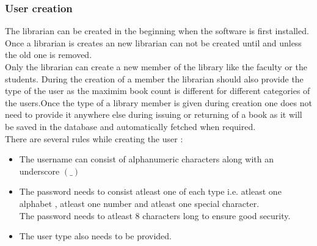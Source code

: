 \documentclass{article}
\begin{document}
\subsubsection*{User creation}
The librarian can be created in the beginning when the software is first installed. Once a librarian is creates an new librarian can not be created until and unless the old one is removed.
\\
Only the librarian can create a new member of the library like the faculty or the students.
During the creation of a member the librarian should also provide the type of the user as the maximim book count is different for different categories of the users.Once the type of a library member is given during creation one does not need to provide it anywhere else during issuing or returning of a book as it will be saved in the database and automatically fetched when required.\\
There are several rules while creating the user :
\begin{itemize}
\item The username can consist of alphanumeric characters along with an underscore $(\_)$
\item The password needs to consist atleast one of each type i.e. atleast one alphabet , atleast one number and atleast one special character.\\
The password needs to atleast 8 characters long to ensure good security.
\item The user type also needs to be provided.

\end{itemize}
\end{document}
